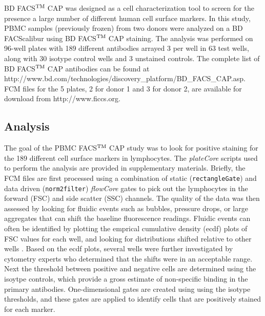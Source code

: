 \documentclass[12pt]{article}
\newcommand{\Robject}[1]{{\texttt{#1}}}
\newcommand{\Rpackage}[1]{{\textit{#1}}}
\def\tm{$^{\rm \text{TM }}$}
\begin{document}
BD FACS\tm CAP was designed as a cell characterization tool to screen for the presence a large number of different human 
cell surface markers. In this study, PBMC samples (previously frozen) from two donors were analyzed on a BD FACScalibur
using BD FACS\tm CAP staining. The analysis was performed on 96-well plates with
189 different antibodies arrayed 3 per well in 63 test wells, along with 30 isotype control wells and 3 unstained controls.
The complete list of BD FACS\tm CAP antibodies can be found at http://www.bd.com/technologies/discovery\_platform/BD\_FACS\_CAP.asp. 
FCM files for the 5 plates, 2 for donor 1 and 3 for donor 2, are available for download from http://www.ficcs.org.

\subsection*{Analysis}

The goal of the PBMC FACS\tm CAP study was to look for positive staining for the 189 different cell
surface markers in lymphocytes. The \Rpackage{plateCore} scripts used to perform the analysis are provided 
in supplementary materials. Briefly, the FCM files are first processed using a combination of static (\Robject{rectangleGate})
and data driven (\Robject{norm2filter}) \Rpackage{flowCore} gates to pick out the lymphocytes in the forward (FSC) and side scatter (SSC)
channels.  The quality of the data was then assessed by looking for fluidic events such as bubbles,
pressure drops, or large aggregates that can shift the baseline fluorescence readings. 
Fluidic events can often be identified by plotting the emprical cumulative density (ecdf) plots of FSC
values for each well, and looking for distributions shifted relative to other wells \citep{lemeur2007}. Based on the ecdf
plots, several wells were further investigated by cytometry experts who determined that the shifts were in an acceptable range.
Next the threshold between positive and negative cells are determined using the isoytpe controls, which provide a gross estimate
of non-specific binding in the primary antibodies. One-dimensional gates are created using using the isotype thresholds, and these
gates are applied to identify cells that are positively stained for each marker. 
\end{document}
